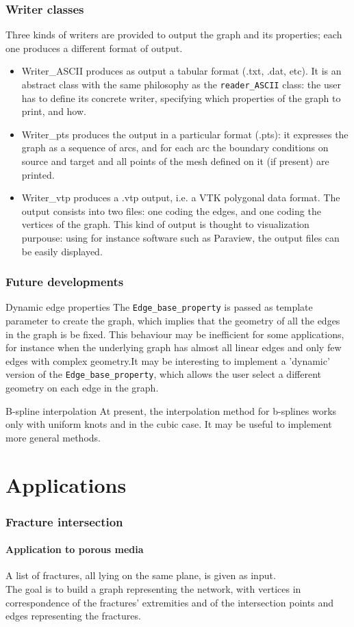 \documentclass[11pt]{beamer}
\newcommand{\classname}[1]{\texttt{#1}}
\begin{document}
	\begin{frame}
		\frametitle{Writer classes}
		Three kinds of writers are provided to output the graph and its properties; each one produces a different format of output.
		\begin{itemize}
			\item{Writer\_ASCII} produces as output a tabular format (.txt, .dat, etc). It is an abstract class with the same philosophy as the \texttt{reader\_ASCII} class: the user has to define its concrete writer, specifying which properties of the graph to print, and how.
			\item{Writer\_pts} produces the output in a particular format (.pts): it expresses the graph as a sequence of arcs, and for each arc the boundary conditions on source and target and all points of the mesh defined on it (if present) are printed. 
			\item{Writer\_vtp} produces a .vtp output, i.e. a VTK polygonal data format. The output consists into two files: one coding the edges, and one coding the vertices of the graph. This kind of output is thought to visualization purpouse: using for instance software such as Paraview, the output files can be easily displayed.
		\end{itemize}
		\end{frame}			
		
		\begin{frame}
			\frametitle{Future developments}
			\begin{block}{Dynamic edge properties}
				The \classname{Edge\_base\_property} is passed as template parameter to create the graph, which implies that the geometry of all the edges in the graph is be fixed. This behaviour may be inefficient for some applications, for instance when the underlying graph has almost all linear edges and only few edges with complex geometry.It may be interesting to implement a 'dynamic' version of the \classname{Edge\_base\_property}, which allows the user select a different geometry on each edge in the graph.
			\end{block}
			\begin{block}{B-spline interpolation}
				At present, the interpolation method for b-splines works only with uniform knots and in the cubic case. It may be useful to implement more general methods.
			\end{block}
		\end{frame}
	
	\section{Applications}
	\begin{frame}
		\frametitle{Fracture intersection}
		\framesubtitle{Application to porous media}
			A list of fractures, all lying on the same plane, is given as input. \\
			The goal is to build a graph representing the network, with vertices in correspondence of the fractures' extremities and of the intersection points and edges representing the fractures.
	\end{frame}
\end{document}
